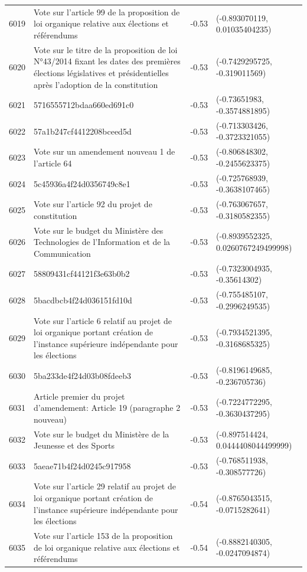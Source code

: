 \begin{table}[ht]
\begin{tabular}{rlrl}
  6019 & Vote sur l'article 99 de la proposition de loi organique relative aux élections et référendums & -0.53 & (-0.893070119, 0.01035404235) \\ 
  6020 & Vote sur le titre de la proposition de loi N°43/2014 fixant les dates des premières élections législatives et présidentielles après l'adoption de la constitution & -0.53 & (-0.7429295725, -0.319011569) \\ 
  6021 & 5716555712bdaa660ed691c0 & -0.53 & (-0.73651983, -0.3574881895) \\ 
  6022 & 57a1b247cf4412208bceed5d & -0.53 & (-0.713303426, -0.3723321055) \\ 
  6023 & Vote sur un amendement nouveau 1 de l'article 64 & -0.53 & (-0.806848302, -0.2455623375) \\ 
  6024 & 5c45936a4f24d0356749c8e1 & -0.53 & (-0.725768939, -0.3638107465) \\ 
  6025 & Vote sur l'article 92 du projet de constitution & -0.53 & (-0.763067657, -0.3180582355) \\ 
  6026 & Vote sur le budget du Ministère des Technologies de l'Information et de la Communication & -0.53 & (-0.8939552325, 0.0260767249499998) \\ 
  6027 & 58809431cf44121f3e63b0b2 & -0.53 & (-0.7323004935, -0.35614302) \\ 
  6028 & 5bacdbcb4f24d036151fd10d & -0.53 & (-0.755485107, -0.2996249535) \\ 
  6029 & Vote sur l'article 6 relatif au projet de loi organique portant création de l'instance supérieure indépendante pour les élections & -0.53 & (-0.7934521395, -0.3168685325) \\ 
  6030 & 5ba233de4f24d03b08fdeeb3 & -0.53 & (-0.8196149685, -0.236705736) \\ 
  6031 & Article premier du projet d'amendement: Article 19 (paragraphe 2 nouveau) & -0.53 & (-0.7224772295, -0.3630437295) \\ 
  6032 & Vote sur le budget du Ministère de la Jeunesse et des Sports & -0.53 & (-0.897514424, 0.0444408044499999) \\ 
  6033 & 5aeae71b4f24d0245c917958 & -0.53 & (-0.768511938, -0.308577726) \\ 
  6034 & Vote sur l'article 29 relatif au projet de loi organique portant création de l'instance supérieure indépendante pour les élections & -0.54 & (-0.8765043515, -0.0715282641) \\ 
  6035 & Vote sur l'article 153 de la proposition de loi organique relative aux élections et référendums & -0.54 & (-0.8882140305, -0.0247094874) \\ 

\end{tabular}
\end{table}
